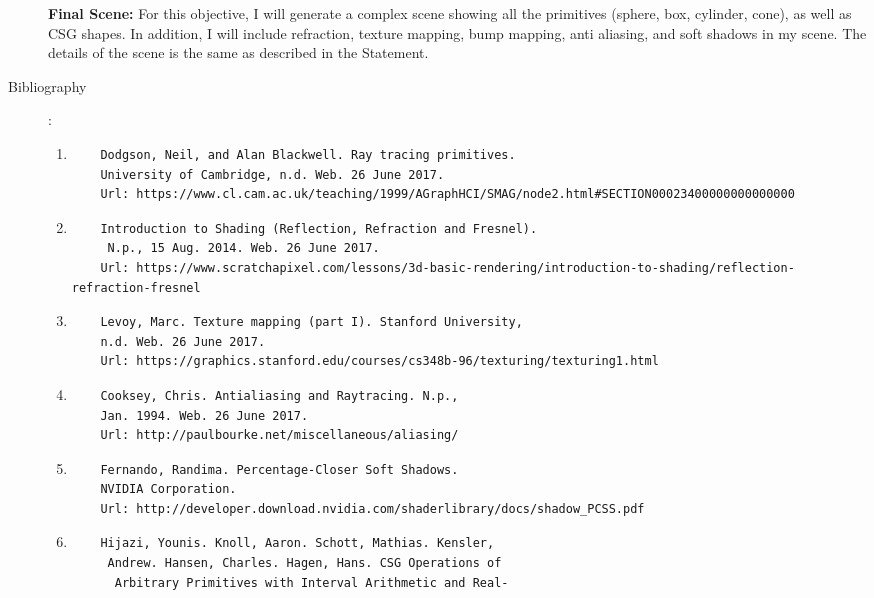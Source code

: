 \documentclass {article}
\begin{document}
\begin{description}
    {\bf Final Scene: }
    For this objective, I will generate a complex scene showing all the primitives (sphere, box, cylinder, cone), as well as CSG shapes. In addition, I will include refraction, texture mapping, bump mapping, anti aliasing, and soft shadows in my scene. The details of the scene is the same as described in the Statement.

\item[Bibliography]:\\
    \begin{enumerate}
    \item
    \begin{verbatim}
    Dodgson, Neil, and Alan Blackwell. Ray tracing primitives. 
    University of Cambridge, n.d. Web. 26 June 2017.
    Url: https://www.cl.cam.ac.uk/teaching/1999/AGraphHCI/SMAG/node2.html#SECTION00023400000000000000
    \end{verbatim}
    \item
    \begin{verbatim}
    Introduction to Shading (Reflection, Refraction and Fresnel).
     N.p., 15 Aug. 2014. Web. 26 June 2017.
    Url: https://www.scratchapixel.com/lessons/3d-basic-rendering/introduction-to-shading/reflection-refraction-fresnel
    \end{verbatim}
    \item
    \begin{verbatim}
    Levoy, Marc. Texture mapping (part I). Stanford University, 
    n.d. Web. 26 June 2017.
    Url: https://graphics.stanford.edu/courses/cs348b-96/texturing/texturing1.html
    \end{verbatim}
    \item
    \begin{verbatim}
    Cooksey, Chris. Antialiasing and Raytracing. N.p., 
    Jan. 1994. Web. 26 June 2017. 
    Url: http://paulbourke.net/miscellaneous/aliasing/
    \end{verbatim}
    \item
    \begin{verbatim}
    Fernando, Randima. Percentage-Closer Soft Shadows. 
    NVIDIA Corporation.
    Url: http://developer.download.nvidia.com/shaderlibrary/docs/shadow_PCSS.pdf
    \end{verbatim}
    \item
    \begin{verbatim}
    Hijazi, Younis. Knoll, Aaron. Schott, Mathias. Kensler,
     Andrew. Hansen, Charles. Hagen, Hans. CSG Operations of
      Arbitrary Primitives with Interval Arithmetic and Real-

\end{verbatim}
\end{enumerate}
\end{description}
\end{document}
